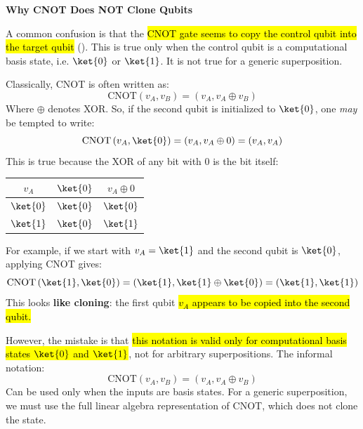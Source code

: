 \highspace
\begin{flushleft}
    \textcolor{Green3}{ \textbf{Why CNOT Does NOT Clone Qubits}}
\end{flushleft}
A common confusion is that the \hl{CNOT gate seems to copy the control qubit into the target qubit} ().
This is true only when the control qubit is a computational basis state, i.e. $\ket{0}$ or $\ket{1}$.
It is not true for a generic superposition.

\highspace
Classically, CNOT is often written as:
\begin{equation*}
    \text{CNOT}\left(v_A,v_B\right) = \left(v_A, v_A \oplus v_B\right)
\end{equation*}
Where $\oplus$ denotes XOR. \textcolor{Red2}{} So, if the second qubit is initialized to $\ket{0}$, one \emph{may} be tempted to write:
\begin{equation*}
    \text{CNOT}\left(v_A,\ket{0}\right) = \left(v_A, v_A \oplus 0\right) = \left(v_A, v_A\right)
\end{equation*}
This is true because the XOR of any bit with $0$ is the bit itself:

\begin{table}[!htp]
    \centering
    \begin{tabular}{@{} c c c @{}}
        \toprule
        $v_A$ & $\ket{0}$ & $v_A \oplus 0$ \\
        \midrule
        $\ket{0}$ & $\ket{0}$ & $\ket{0}$ \\
        $\ket{1}$ & $\ket{0}$ & $\ket{1}$ \\
        \bottomrule
    \end{tabular}
\end{table}

\noindent
For example, if we start with $v_A = \ket{1}$ and the second qubit is $\ket{0}$, applying CNOT gives:
\begin{equation*}
    \text{CNOT}\left(\ket{1},\ket{0}\right) = \left(\ket{1}, \ket{1} \oplus \ket{0}\right) = \left(\ket{1}, \ket{1}\right)
\end{equation*}
This looks \textbf{like cloning}: the first qubit \hl{$v_A$ appears to be copied into the second qubit.}

\highspace
However, the mistake is that \hl{this notation is valid only for computational basis states $\ket{0}$ and $\ket{1}$}, not for arbitrary superpositions. The informal notation:
\begin{equation*}
    \text{CNOT}\left(v_A,v_B\right) = \left(v_A, v_A \oplus v_B\right)
\end{equation*}
Can be used only when the inputs are basis states. For a generic superposition, we must use the full linear algebra representation of CNOT, which does not clone the state.

